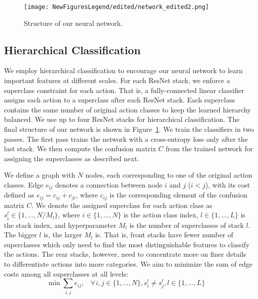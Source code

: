 \documentclass{article}
\begin{document}
\begin{figure}[tb]
\centering
\texttt{[image: NewFiguresLegend/edited/network\_edited2.png]}
\caption{Structure of our neural network.}
\label{fig:network}
\end{figure}

\subsection{Hierarchical Classification}
\label{sec:hierarchy}
{We employ hierarchical classification to encourage our neural network to learn important features at different scales. For each ResNet stack, we enforce a superclass constraint for each action. That is, a fully-connected linear classifier assigns each action to a superclass after each ResNet stack. Each superclass contains the same number of original action classes to keep the learned hierarchy balanced. We use up to four ResNet stacks for hierarchical classification. The final structure of our network is shown in Figure~\ref{fig:network}. We train the classifiers in two passes. The first pass trains the network with a cross-entropy loss only after the last stack. We then compute the confusion matrix $C$ from the trained network for assigning the superclasses as described next. }



{We define a graph with $N$ nodes, each corresponding to one of the original action classes. Edge $e_{ij}$ denotes a connection between node $i$ and $j$ ($i < j$), with its cost defined as $e_{ij} = c_{ij} + c_{ji}$, where $c_{ij}$ is the corresponding element of the confusion matrix $C$. We denote the assigned superclass for each action class as $s_{i}^{l} \in \{1,...,N/M_l\}$, where $i \in \{1,...,N\}$ is the action class index, $l \in \{1,...,L\}$ is the stack index, and hyperparameter $M_l$ is the number of superclasses of stack $l$. The bigger $l$ is, the larger $M_l$ is. That is, front stacks have fewer number of superclasses which only need to find the most distinguishable features to classify the actions. The rear stacks, however, need to concentrate more on finer details to differentiate actions into more categories. We aim to minimize the sum of edge costs among all superclasses at all levels:
\begin{equation}\label{cost function}
     \min \sum_{i,j}{e_{ij}}, \hspace{10pt} \forall \hspace{1pt} i,j \in \{1,...,N\}, s_{i}^{l} \neq s_{j}^{l}, l \in \{1,...,L\} \quad
\end{equation}
}
\end{document}
